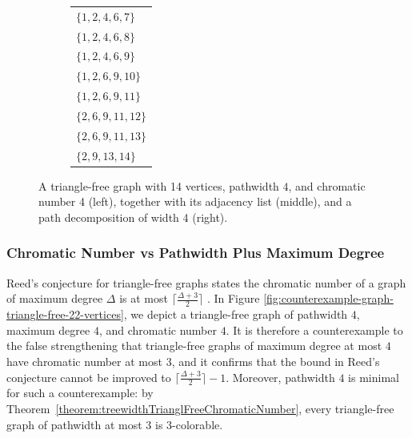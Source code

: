 \documentclass[11pt,a4paper]{article}
\begin{document}
\begin{figure}[H]
\begin{subfigure}{0.3\textwidth}
{\begin{tabular}{@{}l@{}}
$\{1,2,4,6,7\}$ \\
$\{1,2,4,6,8\}$ \\
$\{1,2,4,6,9\}$ \\
$\{1,2,6,9,10\}$ \\
$\{1,2,6,9,11\}$ \\
$\{2,6,9,11,12\}$ \\
$\{2,6,9,11,13\}$ \\
$\{2,9,13,14\}$ \\
\end{tabular}}
\end{subfigure}
\caption{A triangle-free graph with 14 vertices, pathwidth $4$, and chromatic number 4 (left), together with its adjacency list (middle), and a path decomposition of width 4 (right).}
\label{fig:counterexample-graph-triangle-free-14-vertices}
\end{figure}





\subsubsection{Chromatic Number vs Pathwidth Plus Maximum Degree}

Reed's conjecture for triangle-free graphs states the chromatic number of a graph of maximum degree $\Delta$ is at most $\lceil\frac{ \Delta+3}{2}\rceil$ \cite{reed1998omega}.
In Figure \ref{fig:counterexample-graph-triangle-free-22-vertices}, we depict a triangle-free graph of pathwidth $4$, maximum degree $4$, and chromatic number $4$. It is therefore a counterexample to the false strengthening that triangle-free graphs of maximum degree at most $4$ have chromatic number at most $3$, and it confirms that the bound in Reed's conjecture cannot be improved to $\lceil\frac{ \Delta+3}{2}\rceil-1$. Moreover, pathwidth $4$ is minimal for such a counterexample: by Theorem~\ref{theorem:treewidthTrianglFreeChromaticNumber}, every triangle-free graph of pathwidth at most $3$ is $3$-colorable.
\end{document}
